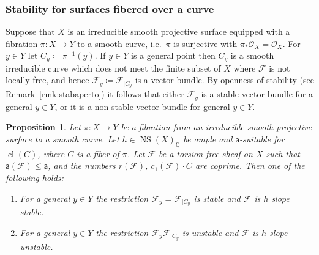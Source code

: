 \documentclass[11pt]{amsart}
\newcommand{\QQ}{{\mathbb Q}}
\let\mathcal\mathscr
\def\cF{\mathcal{F}}
\def\cO{\mathcal{O}}
\DeclareMathOperator{\cl}{cl}
\DeclareMathOperator{\NS}{NS}
\newtheorem{prp}[lmm]{Proposition}
\theoremstyle{definition}
\theoremstyle{remark}
\begin{document}
\subsubsection{Stability for surfaces fibered over a curve}\label{subsubsec:stabsupfibr}
%
Suppose that $X$ is an irreducible smooth projective surface equipped with a fibration $\pi\colon X\to Y$ to a smooth curve, i.e.~$\pi$ is surjective  with 
$\pi_{*}\cO_X=\cO_X$. For $y\in Y$ let $C_y\coloneqq\pi^{-1}(y)$. 
If $y\in Y$  is a general point   then
$C_y$ is a smooth irreducible curve which does not meet the finite subset of $X$ where $\cF$ is not locally-free, and hence 
$\cF_{y}\coloneqq \cF_{|C_y}$ is a vector bundle. By openness of stability (see Remark~\ref{rmk:stabaperto}) it follows that  either $\cF_{y}$ 
 is a stable vector bundle for
a general  $y\in Y$,   or it is a non stable vector bundle
  for general  $y\in Y$. 
%
\begin{prp}\label{prp:fvsupfib}
%
Let $\pi\colon X\to Y$ be  a fibration from  an irreducible smooth projective surface to a smooth curve.
 Let $h\in\NS(X)_{\QQ}$ be ample and ${\mathsf a}$-suitable for $\cl(C)$, where $C$ is a fiber of $\pi$.  Let $\cF$ be a torsion-free sheaf on $X$ such that 
 ${\mathsf a}(\cF)\le {\mathsf a}$, and the numbers
 $r(\cF)$, $c_1(\cF)\cdot C$ are coprime. Then one of the following holds:
\begin{enumerate}
%
\item
%
For a general $y\in Y$  the restriction $\cF_{y}= \cF_{|C_y}$ is  stable and $\cF$ is $h$ slope stable.
%
\item
%
For a general $y\in Y$  the restriction $\cF_{y} \cF_{|C_y}$ is  unstable and $\cF$ is $h$ slope unstable. 
%
\end{enumerate}
%
%
\end{prp}
%
%
\end{document}
